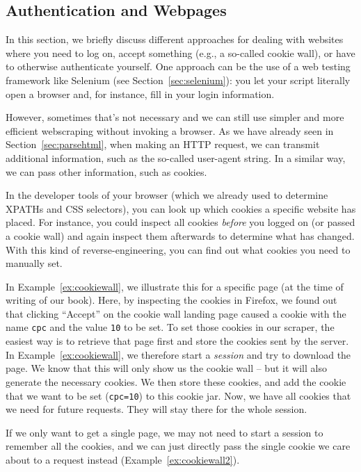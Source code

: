 \subsection{Authentication and Webpages} \label{sec:authweb}

In this section, we briefly discuss different approaches for dealing
with websites where you need to log on, accept something (e.g., a
so-called cookie wall), or have to otherwise authenticate yourself.
One approach can be the use of a web testing framework like Selenium
(see Section~\ref{sec:selenium}): you let your script literally open a browser
and, for instance, fill in your login information.

However, sometimes that's not necessary and we can still use simpler
and more efficient webscraping without invoking a browser. As we have already
seen in Section~\ref{sec:parsehtml}, when making an HTTP request, we can transmit
additional information, such as the so-called user-agent string. In a
similar way, we can pass other information, such as cookies.

In the developer tools of your browser (which we already used to determine
XPATHs and CSS selectors), you can look up which cookies a specific website
has placed. For instance, you could inspect all cookies \emph{before} you
logged on (or passed a cookie wall) and again inspect them afterwards to
determine what has changed. With this kind of reverse-engineering, you
can find out what cookies you need to manually set.

In Example~\ref{ex:cookiewall}, we illustrate this for a specific page  (at the
time of writing of our book). Here, by inspecting the cookies in Firefox,
we found out that clicking ``Accept'' on the cookie wall landing page
caused a cookie with the name \verb|cpc| and the value \verb|10| to be set.   To set those cookies in our scraper, the easiest way is to retrieve that page first and store the cookies sent by the server. In Example~\ref{ex:cookiewall}, we therefore start a \emph{session}
and try to download the page. We know that this will only show us the
cookie wall -- but it will also generate the necessary cookies. We then
store these cookies, and add the cookie that we want to be set (\verb|cpc=10|)
to this cookie jar. Now, we have all cookies that we need for future
requests. They will stay there for the whole session.

If we only want to get a single page, we may not need to start a session
to remember all the cookies, and we can just directly pass the single
cookie we care about to a request instead (Example~\ref{ex:cookiewall2}).




